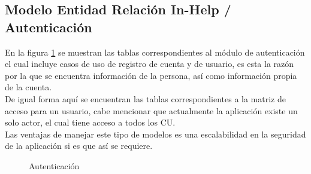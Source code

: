 \subsection{Modelo Entidad Relación In-Help / Autenticación}
En la figura \ref{fig:BD_Autenticacion} se muestran las tablas correspondientes al módulo de autenticación el cual incluye casos de uso de registro de cuenta y de usuario, es esta la razón por la que se encuentra información de la persona, así como información propia de la cuenta.\\
De igual forma aquí se encuentran las tablas correspondientes a la matriz de acceso para un usuario, cabe mencionar que actualmente la aplicación existe un solo actor, el cual tiene acceso a todos los CU.\\
Las ventajas de manejar este tipo de modelos es una escalabilidad en la seguridad de la aplicación si es que así se requiere.
\begin{figure}[htbp!]
	\centering
	\caption{Autenticación}
	\label{fig:BD_Autenticacion}
\end{figure}

